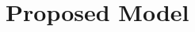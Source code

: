 \documentclass[11pt,letterpaper]{article}
\begin{document}



\section{Proposed Model}
\end{document}
